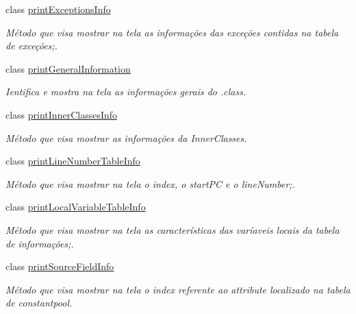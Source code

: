 \begin{DoxyCompactItemize}
class \hyperlink{classClassPrinter_1_1printExceptionsInfo}{print\+Exceptions\+Info}
\begin{DoxyCompactList}\small\item\em Método que visa mostrar na tela as informações das exceções contidas na tabela de exceções;. \end{DoxyCompactList}\item 
class \hyperlink{classClassPrinter_1_1printGeneralInformation}{print\+General\+Information}
\begin{DoxyCompactList}\small\item\em Ientifica e mostra na tela as informações gerais do .class. \end{DoxyCompactList}\item 
class \hyperlink{classClassPrinter_1_1printInnerClassesInfo}{print\+Inner\+Classes\+Info}
\begin{DoxyCompactList}\small\item\em Método que visa mostrar as informações da Inner\+Classes. \end{DoxyCompactList}\item 
class \hyperlink{classClassPrinter_1_1printLineNumberTableInfo}{print\+Line\+Number\+Table\+Info}
\begin{DoxyCompactList}\small\item\em Método que visa mostrar na tela o index, o start\+PC e o line\+Number;. \end{DoxyCompactList}\item 
class \hyperlink{classClassPrinter_1_1printLocalVariableTableInfo}{print\+Local\+Variable\+Table\+Info}
\begin{DoxyCompactList}\small\item\em Método que visa mostrar na tela as características das varíaveis locais da tabela de informações;. \end{DoxyCompactList}\item 
class \hyperlink{classClassPrinter_1_1printSourceFieldInfo}{print\+Source\+Field\+Info}
\begin{DoxyCompactList}\small\item\em Método que visa mostrar na tela o index referente ao attribute localizado na tabela de constantpool. \end{DoxyCompactList}\end{DoxyCompactItemize}
